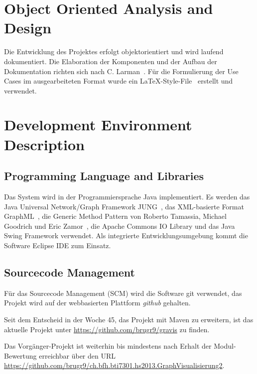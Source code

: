 \section{Object Oriented Analysis and Design}
\label{sec:Object Oriented Analysis and Design}
Die Entwicklung des Projektes erfolgt objektorientiert und wird laufend dokumentiert. Die Elaboration der Komponenten und der Aufbau der Dokumentation richten sich nach C. Larman~\cite{larmann:2004}. F\"ur die Formulierung der Use Cases im ausgearbeiteten Format wurde ein \LaTeX-Style-File~\cite{bruggmann:2013} erstellt und verwendet.
% 
\section{Development Environment Description}
\label{sec:Development Environment Description}
% 
\subsection{Programming Language and Libraries}
\label{subsec:Programming Language and Libraries}
Das System wird in der Programmiersprache Java implementiert. Es werden das Java Universal Network/Graph Framework JUNG~\cite{jung:2013}, das XML-basierte Format GraphML~\cite{graphml:2013}, die Generic Method Pattern von Roberto Tamassia, Michael Goodrich und Eric Zamor~\cite{tamassiagoodrichzamor:2013}, die Apache Commons IO Library und das Java Swing Framework verwendet. Als integrierte Entwicklungsumgebung kommt die Software Eclipse IDE zum Einsatz.
% 
\subsection{Sourcecode Management}
\label{subsec:Sourcecode Management}
F\"ur das Sourcecode Management (SCM) wird die Software git verwendet, das Projekt wird auf der webbasierten Plattform \textit{github} gehalten.

Seit dem Entscheid in der Woche 45, das Projekt mit Maven zu erweitern, ist das aktuelle Projekt unter \url{https://github.com/brugr9/gravis} zu finden.

Das Vorg\"anger-Projekt ist weiterhin bis mindestens nach Erhalt der Modul-Bewertung erreichbar \"uber den URL \url{https://github.com/brugr9/ch.bfh.bti7301.hs2013.GraphVisualisierung2}.
